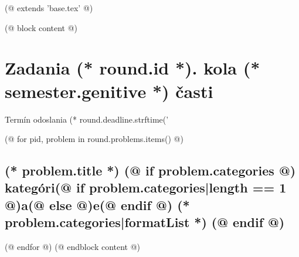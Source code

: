 (@ extends 'base.tex' @)
 
(@ block content @)
    

    \pagestyle{problems-(* competition.id *)-(* volume.id *)-(* semester.id *)-(* round.id *)}
    \thispagestyle{first-(* competition.id *)-(* volume.id *)-(* semester.id *)}
    \vspace*{8mm}

    {
        \section{\texorpdfstring{Zadania (* round.id *). kola (* semester.genitive *) časti}{Zadania}}
        \centering
        \vspace*{-5mm}
        Termín odoslania (* round.deadline.strftime('%
    } 
        
    (@ for pid, problem in round.problems.items() @)%
        \setcounter{volume}{(* volume.number *)}%
        \setcounter{semester}{(* semester.number *)}%
        \setcounter{round}{(* round.number *)}%
        \setcounter{problem}{(* problem.number *)}%
        
        \subsection{%
            \texorpdfstring{%
                \large \textbf{(* problem.title *)}%
                (@ if problem.categories @)%
                \normalsize \hfill kategóri(@ if problem.categories|length == 1 @)a(@ else @)e(@ endif @) (* problem.categories|formatList *)%
                (@ endif @)
            }{%
                (* round.number *).(* problem.number *) (* problem.title *)%
            }%
        }%
    (@ endfor @)
(@ endblock content @)
